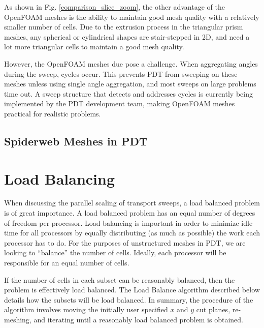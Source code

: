 \documentclass[11pt, letterpaper,titlepage,oneside]{article}
\begin{document}
As shown in Fig. \ref{comparison_slice_zoom}, the other advantage of the OpenFOAM meshes is the ability to maintain good mesh quality with a relatively smaller number of cells. Due to the extrusion process in the triangular prism meshes, any spherical or cylindrical shapes are stair-stepped in 2D, and need a lot more triangular cells to maintain a good mesh quality.

However, the OpenFOAM meshes due pose a challenge. When aggregating angles during the sweep, cycles occur. This prevents PDT from sweeping on these meshes unless using single angle aggregation, and most sweeps on large problems time out. A sweep structure that detects and addresses cycles is currently being implemented by the PDT development team, making OpenFOAM meshes practical for realistic problems.

\subsection{Spiderweb Meshes in PDT}

\section{Load Balancing}

When discussing the parallel scaling of transport sweeps, a load balanced problem is of great importance. A load balanced problem has an equal number of degrees of freedom per processor. Load balancing is important in order to minimize idle time for all processors by equally distributing (as much as possible) the work each processor has to do.  For the purposes of unstructured meshes in PDT, we are looking to ``balance'' the number of cells. Ideally, each processor will be responsible for an equal number of cells. 

If the number of cells in each subset can be reasonably balanced, then the problem is effectively load balanced. The Load Balance algorithm described below details how the subsets will be load balanced. In summary, the procedure of the algorithm involves moving the initially user specified $x$ and $y$ cut planes, re-meshing, and iterating until a reasonably load balanced problem is obtained. 
\end{document}
